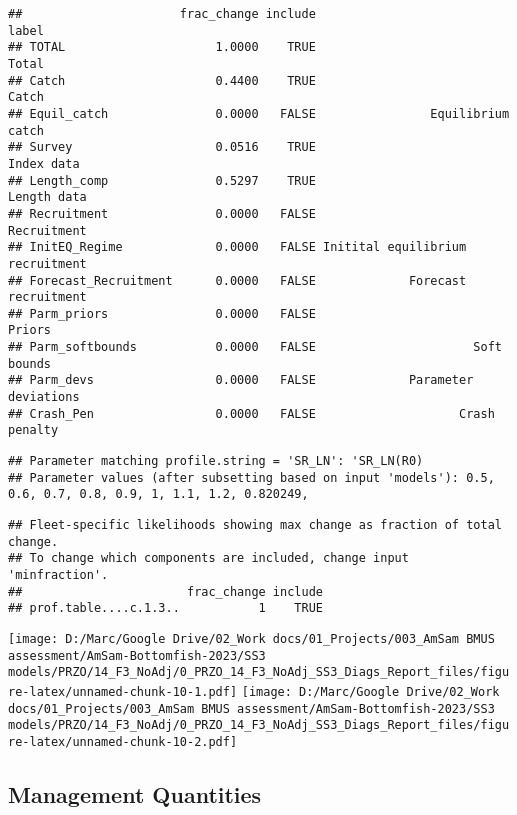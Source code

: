 \documentclass[
]{article}
\begin{document}
\begin{verbatim}
##                      frac_change include                            label
## TOTAL                     1.0000    TRUE                            Total
## Catch                     0.4400    TRUE                            Catch
## Equil_catch               0.0000   FALSE                Equilibrium catch
## Survey                    0.0516    TRUE                       Index data
## Length_comp               0.5297    TRUE                      Length data
## Recruitment               0.0000   FALSE                      Recruitment
## InitEQ_Regime             0.0000   FALSE Initital equilibrium recruitment
## Forecast_Recruitment      0.0000   FALSE             Forecast recruitment
## Parm_priors               0.0000   FALSE                           Priors
## Parm_softbounds           0.0000   FALSE                      Soft bounds
## Parm_devs                 0.0000   FALSE             Parameter deviations
## Crash_Pen                 0.0000   FALSE                    Crash penalty
\end{verbatim}

\begin{verbatim}
## Parameter matching profile.string = 'SR_LN': 'SR_LN(R0)
## Parameter values (after subsetting based on input 'models'): 0.5, 0.6, 0.7, 0.8, 0.9, 1, 1.1, 1.2, 0.820249,
\end{verbatim}

\begin{verbatim}
## Fleet-specific likelihoods showing max change as fraction of total change.
## To change which components are included, change input 'minfraction'.
##                       frac_change include
## prof.table....c.1.3..           1    TRUE
\end{verbatim}

\texttt{[image: D:/Marc/Google Drive/02\_Work docs/01\_Projects/003\_AmSam BMUS assessment/AmSam-Bottomfish-2023/SS3 models/PRZO/14\_F3\_NoAdj/0\_PRZO\_14\_F3\_NoAdj\_SS3\_Diags\_Report\_files/figure-latex/unnamed-chunk-10-1.pdf]}
\texttt{[image: D:/Marc/Google Drive/02\_Work docs/01\_Projects/003\_AmSam BMUS assessment/AmSam-Bottomfish-2023/SS3 models/PRZO/14\_F3\_NoAdj/0\_PRZO\_14\_F3\_NoAdj\_SS3\_Diags\_Report\_files/figure-latex/unnamed-chunk-10-2.pdf]}

\hypertarget{management-quantities}{%
\subsection{Management Quantities}\label{management-quantities}}
\end{document}
